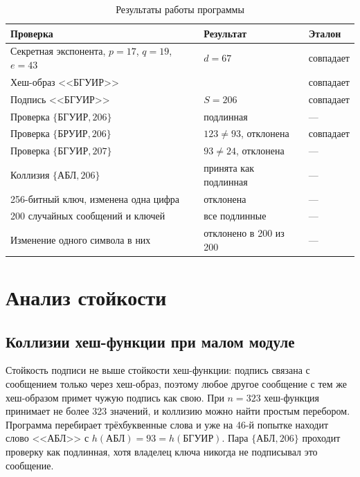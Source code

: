 \documentclass[14pt,a4paper]{extarticle}
\begin{document}
\begin{table}[H]
\caption{Результаты работы программы}
\label{tab:results}
\centering
\begin{tabularx}{\textwidth}{X>{\raggedright\arraybackslash}p{5.4cm}l}
\toprule
Проверка & Результат & Эталон \\
\midrule
Секретная экспонента, $p = 17$, $q = 19$, $e = 43$ & $d = 67$ & совпадает \\
Хеш-образ <<БГУИР>> & 93 & совпадает \\
Подпись <<БГУИР>> & $S = 206$ & совпадает \\
Проверка $\{\text{БГУИР}, 206\}$ & подлинная & --- \\
Проверка $\{\text{БРУИР}, 206\}$ & $123 \ne 93$, отклонена & совпадает \\
Проверка $\{\text{БГУИР}, 207\}$ & $93 \ne 24$, отклонена & --- \\
Коллизия $\{\text{АБЛ}, 206\}$ & принята как подлинная & --- \\
256-битный ключ, изменена одна цифра & отклонена & --- \\
200 случайных сообщений и ключей & все подлинные & --- \\
Изменение одного символа в них & отклонено в 200 из 200 & --- \\
\bottomrule
\end{tabularx}
\end{table}


\section{Анализ стойкости}

\subsection{Коллизии хеш-функции при малом модуле}

Стойкость подписи не выше стойкости хеш-функции: подпись связана с сообщением только
через хеш-образ, поэтому любое другое сообщение с тем же хеш-образом примет чужую
подпись как свою. При $n = 323$ хеш-функция принимает не более 323 значений, и
коллизию можно найти простым перебором. Программа перебирает трёхбуквенные слова и
уже на 46-й попытке находит слово <<АБЛ>> с $h(\text{АБЛ}) = 93 = h(\text{БГУИР})$.
Пара $\{\text{АБЛ}, 206\}$ проходит проверку как подлинная, хотя владелец ключа
никогда не подписывал это сообщение.
\end{document}
